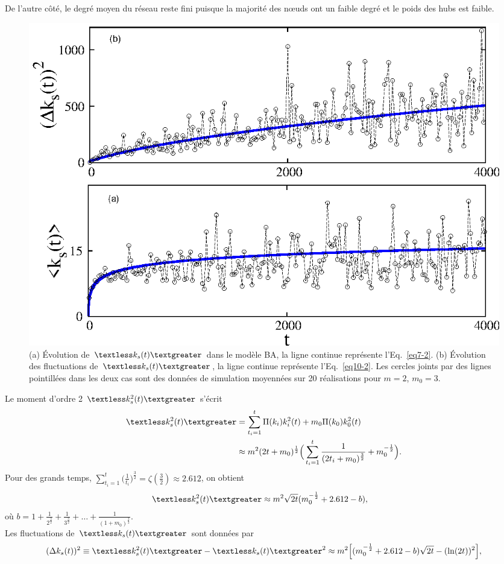 De l'autre côté, le degré moyen du réseau reste fini \cite{Barrat-a2008l,Cohen-Havlinl2010} puisque la majorité des nœuds ont un faible degré et le poids des hubs est faible.\\
\begin{figure}[h]
	\centering
	\includegraphics[scale=1]{./figures/nfig2}
	\caption{(a) Évolution de $\kms$ dans le modèle BA, la ligne continue représente l'Eq.~\eqref{eq7-2}.
		(b) Évolution des fluctuations de $\kms$, la ligne continue représente l'Eq.~\eqref{eq10-2}. Les cercles joints par des lignes pointillées dans les deux cas sont des données de simulation moyennées sur 20 réalisations pour $m =2$, $m_0=3$.}
	\label{fig2a-2}
\end{figure}
Le moment d'ordre 2 $\kmss$ s'écrit
\begin{align}
\kmss&=\sum_{t_i=1}^t\Pi(k_i)k^2_i(t)+m_0\Pi(k_0)k_0^2(t)\label{eq8-2} \\
&\approx m^2(2t+m_0)^{\frac{1}{2}} \Big(\sum_{t_i=1}^t \frac{1}{(2t_i+m_0)^{\frac{3}{2}}}+m_0^{-\frac{1}{2}}\Big).
\end{align}
Pour des grands temps, $\sum_{t_i=1}^t\Big(\frac{1}{t_i}\Big)^{\frac{3}{2}}=\zeta(\frac{3}{2}) \approx 2.612$, on obtient 
\begin{eqnarray}
\begin{split}
\kmss&\approx m^2\sqrt{2t}(m_0^{-\frac{1}{2}}+2.612-b),
\label{eq9-2}
\end{split}
\end{eqnarray}
où $b=1+\frac{1}{2^\frac{3}{2}}+\frac{1}{3^\frac{3}{2}}+\ldots+\frac{1}{(1+m_0)^\frac{3}{2}}$.\\
Les fluctuations de $\kms$ sont données par
\begin{align}
(\Delta k_s(t))^2 \equiv \kmss-\kms^2\approx m^2 \Big[(m_0^{-\frac{1}{2}}+2.612-b)\sqrt{2t}-(\ln(2t))^2\Big],
\label{eq10-2}
\end{align}
